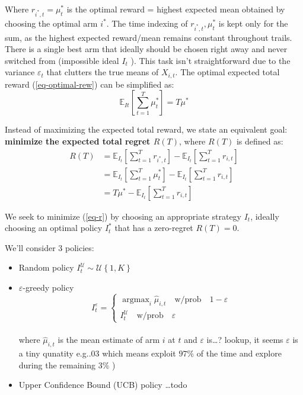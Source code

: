 \documentclass[12pt,english]{article}
\DeclareMathOperator*{\argmax}{argmax}
\begin{document}
Where \(r_{i^{\ast},t} = \mu_{t}^{\ast}\) is the optimal reward = highest expected mean obtained by choosing the optimal arm \(i^{\ast}\). The time indexing of \(r_{i^{\ast},t}, \mu_{t}^{\ast}\) is kept only for the sum, as the highest expected reward/mean remains constant throughout trails. There is a single best arm that ideally should be chosen right away and never switched from (impossible ideal \(I_{t}\) ). This task isn't straightforward due to the variance \(\varepsilon_t\) that clutters the true means of \(X_{i,t}\). The optimal expected total reward (\ref{eq-optimal-rew}) can be simplified as:
\begin{equation}
\mathbb{E}_{It} \left[ \sum_{t=1}^{T} \mu_{t}^{\ast} \right] = 	T \mu^{\ast}
\end{equation}

Instead of maximizing the expected total reward, we state an equivalent goal: \textbf{minimize the expected total regret \(R\left( T \right)\)}, where \(R\left( T \right) \) is defined as:
\begin{equation}\label{eq-r}
	\begin{aligned}
		R\left( T \right) &= \mathbb{E}_{I_t} \left[ \sum_{t=1}^{T} r_{i^{\ast},t} \right] - \mathbb{E}_{I_t} \left[ \sum_{t=1}^T r_{i,t}\right] \\
		&= \mathbb{E}_{I_t} \left[ \sum_{t=1}^{T} \mu_{t}^{\ast} \right] - \mathbb{E}_{I_t} \left[ \sum_{t=1}^T r_{i,t}\right] \\
		&= T\mu^{\ast} - \mathbb{E}_{I_t} \left[ \sum_{t=1}^T r_{i,t}\right]
	\end{aligned}
\end{equation}

We seek to minimize (\ref{eq-r}) by choosing an appropriate strategy \(I_{t}\), ideally choosing an optimal policy \(I_{t}^{\ast}\) that has a zero-regret \(R\left( T \right) = 0\).

We'll consider \(3\) policies:
\begin{itemize}
	\item Random policy \(I_{t}^{\mathcal{U}} \sim \mathcal{U}\left\{ 1,K \right\} \) 
	\item \(\varepsilon\)-greedy policy
		\[I_{t}^{\varepsilon} = \begin{cases}
		\argmax_{i} \hat{\mu}_{i,t} \quad \text{w/prob} \quad 1-\varepsilon\\
		I_{t}^{\mathcal{U}} \quad \text{w/prob} \quad \varepsilon
	\end{cases}\]\\ 
	where \(\hat{\mu}_{i,t}\) is the mean estimate of arm \(i\) at \(t\) and \(\varepsilon\) is\dots ? lookup, it seems \(\varepsilon\) is a tiny qunatity e.g.\@ \(.03\) which means exploit \(97\%\) of the time and explore during the remaining \(3\%\)  )
	\item Upper Confidence Bound (UCB) policy \dots todo 
\end{itemize}
\end{document}
